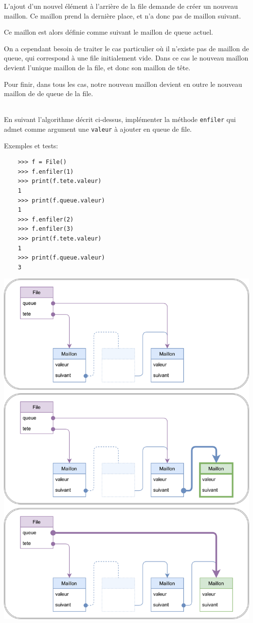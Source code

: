 \documentclass[a4paper,17pt]{extarticle}
\let\origfigure\figure
\let\endorigfigure\endfigure
\renewenvironment{figure}[1][2] {
    \expandafter\origfigure\expandafter[H]
} {
    \endorigfigure
}
\newenvironment{eleve}%
{\begin{activite}\color{noiramu}\\[-0.5cm]}
{\end{activite}}
\begin{document}
    L'ajout d'un nouvel élément à l'arrière de la file demande de créer un
nouveau maillon. Ce maillon prend la dernière place, et n'a donc pas de
maillon suivant.

Ce maillon est alors définie comme suivant le maillon de queue actuel.

On a cependant besoin de traiter le cas particulier où il n'existe pas
de maillon de queue, qui correspond à une file initialement vide. Dans
ce cas le nouveau maillon devient l'unique maillon de la file, et donc
son maillon de tête.

Pour finir, dans tous les cas, notre nouveau maillon devient en outre le
nouveau maillon de de queue de la file.
\begin{eleve}
    En suivant l'algorithme décrit ci-dessus, implémenter la méthode
\texttt{enfiler} qui admet comme argument une \texttt{valeur} à ajouter
en queue de file.

Exemples et tests:

\begin{verbatim}
    >>> f = File()
    >>> f.enfiler(1)
    >>> print(f.tete.valeur)
    1
    >>> print(f.queue.valeur)
    1
    >>> f.enfiler(2)
    >>> f.enfiler(3)
    >>> print(f.tete.valeur)
    1
    >>> print(f.queue.valeur)
    3
\end{verbatim}
        
        \end{eleve}
    \begin{figure}
\centering
\includegraphics{img-enfiler.png}
\caption{Algorithme pour enfiler une valeur}
\end{figure}
\end{document}
